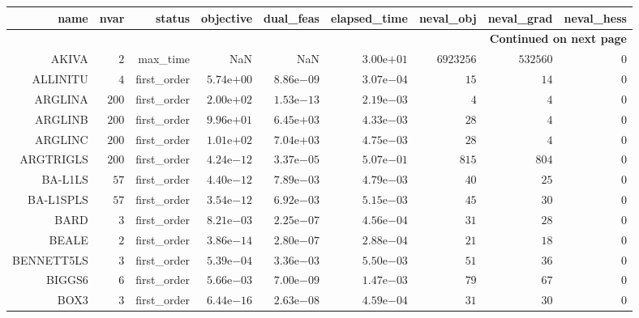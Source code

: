 \begin{longtable}{rrrrrrrrr}
\hline
name & nvar & status & objective & dual\_feas & elapsed\_time & neval\_obj & neval\_grad & neval\_hess \\\hline
\endhead
\hline
\multicolumn{9}{r}{{\bfseries Continued on next page}}\\
\hline
\endfoot
\endlastfoot
AKIVA & \(     2\) & max\_time &       NaN &       NaN & \( 3.00\)e\(+01\) & \(6923256\) & \(532560\) & \(     0\) \\
ALLINITU & \(     4\) & first\_order & \( 5.74\)e\(+00\) & \( 8.86\)e\(-09\) & \( 3.07\)e\(-04\) & \(    15\) & \(    14\) & \(     0\) \\
ARGLINA & \(   200\) & first\_order & \( 2.00\)e\(+02\) & \( 1.53\)e\(-13\) & \( 2.19\)e\(-03\) & \(     4\) & \(     4\) & \(     0\) \\
ARGLINB & \(   200\) & first\_order & \( 9.96\)e\(+01\) & \( 6.45\)e\(+03\) & \( 4.33\)e\(-03\) & \(    28\) & \(     4\) & \(     0\) \\
ARGLINC & \(   200\) & first\_order & \( 1.01\)e\(+02\) & \( 7.04\)e\(+03\) & \( 4.75\)e\(-03\) & \(    28\) & \(     4\) & \(     0\) \\
ARGTRIGLS & \(   200\) & first\_order & \( 4.24\)e\(-12\) & \( 3.37\)e\(-05\) & \( 5.07\)e\(-01\) & \(   815\) & \(   804\) & \(     0\) \\
BA-L1LS & \(    57\) & first\_order & \( 4.40\)e\(-12\) & \( 7.89\)e\(-03\) & \( 4.79\)e\(-03\) & \(    40\) & \(    25\) & \(     0\) \\
BA-L1SPLS & \(    57\) & first\_order & \( 3.54\)e\(-12\) & \( 6.92\)e\(-03\) & \( 5.15\)e\(-03\) & \(    45\) & \(    30\) & \(     0\) \\
BARD & \(     3\) & first\_order & \( 8.21\)e\(-03\) & \( 2.25\)e\(-07\) & \( 4.56\)e\(-04\) & \(    31\) & \(    28\) & \(     0\) \\
BEALE & \(     2\) & first\_order & \( 3.86\)e\(-14\) & \( 2.80\)e\(-07\) & \( 2.88\)e\(-04\) & \(    21\) & \(    18\) & \(     0\) \\
BENNETT5LS & \(     3\) & first\_order & \( 5.39\)e\(-04\) & \( 3.36\)e\(-03\) & \( 5.50\)e\(-03\) & \(    51\) & \(    36\) & \(     0\) \\
BIGGS6 & \(     6\) & first\_order & \( 5.66\)e\(-03\) & \( 7.00\)e\(-09\) & \( 1.47\)e\(-03\) & \(    79\) & \(    67\) & \(     0\) \\
BOX3 & \(     3\) & first\_order & \( 6.44\)e\(-16\) & \( 2.63\)e\(-08\) & \( 4.59\)e\(-04\) & \(    31\) & \(    30\) & \(     0\) \\

\end{longtable}
